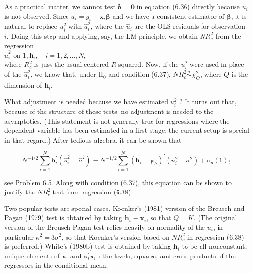 \documentclass[10pt]{article}
\begin{document}
As a practical matter, we cannot test $\boldsymbol{\delta}=\mathbf{0}$ in equation (6.36) directly because $u_{i}$ is not observed. Since $u_{i}=y_{i}-\mathbf{x}_{i} \boldsymbol{\beta}$ and we have a consistent estimator of $\boldsymbol{\beta}$, it is natural to replace $u_{i}^{2}$ with $\hat{u}_{i}^{2}$, where the $\hat{u}_{i}$ are the OLS residuals for observation $i$. Doing this step and applying, say, the LM principle, we obtain $N R_{c}^{2}$ from the regression\\
$\hat{u}_{i}^{2}$ on $1, \mathbf{h}_{i}, \quad i=1,2, \ldots, N$,\\
where $R_{c}^{2}$ is just the usual centered $R$-squared. Now, if the $u_{i}^{2}$ were used in place of the $\hat{u}_{i}^{2}$, we know that, under $\mathrm{H}_{0}$ and condition (6.37), $N R_{c}^{2} \stackrel{a}{\sim} \chi_{Q}^{2}$, where $Q$ is the dimension of $\mathbf{h}_{i}$.

What adjustment is needed because we have estimated $u_{i}^{2}$ ? It turns out that, because of the structure of these tests, no adjustment is needed to the asymptotics. (This statement is not generally true for regressions where the dependent variable has been estimated in a first stage; the current setup is special in that regard.) After tedious algebra, it can be shown that


\begin{equation*}
N^{-1 / 2} \sum_{i=1}^{N} \mathbf{h}_{i}^{\prime}\left(\hat{u}_{i}^{2}-\hat{\sigma}^{2}\right)=N^{-1 / 2} \sum_{i=1}^{N}\left(\mathbf{h}_{i}-\boldsymbol{\mu}_{h}\right)^{\prime}\left(u_{i}^{2}-\sigma^{2}\right)+\mathrm{o}_{p}(1) ; \tag{6.39}
\end{equation*}


see Problem 6.5. Along with condition (6.37), this equation can be shown to justify the $N R_{c}^{2}$ test from regression (6.38).

Two popular tests are special cases. Koenker's (1981) version of the Breusch and Pagan (1979) test is obtained by taking $\mathbf{h}_{i} \equiv \mathbf{x}_{i}$, so that $Q=K$. (The original version of the Breusch-Pagan test relies heavily on normality of the $u_{i}$, in particular $\kappa^{2}=3 \sigma^{2}$, so that Koenker's version based on $N R_{c}^{2}$ in regression (6.38) is preferred.) White's (1980b) test is obtained by taking $\mathbf{h}_{i}$ to be all nonconstant, unique elements of $\mathbf{x}_{i}$ and $\mathbf{x}_{i}^{\prime} \mathbf{x}_{i}$ : the levels, squares, and cross products of the regressors in the conditional mean.
\end{document}
